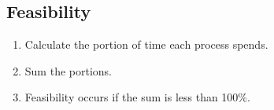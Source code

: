 \documentclass[landscape]{cheat}
\begin{document}
\begin{multicols*}{3}
\subsection{Feasibility}
\begin{enumerate}
    \item Calculate the portion of time each process spends.
    \item Sum the portions.
    \item Feasibility occurs if the sum is less than 100\%.
\end{enumerate}

\end{multicols*}
\end{document}
